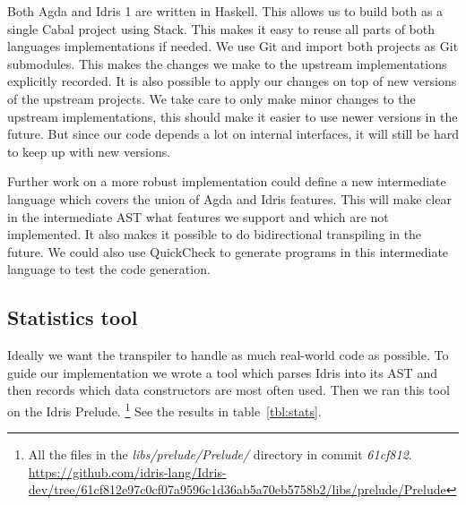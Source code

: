 Both Agda and Idris 1 are written in Haskell.  This allows us to build both as
a single Cabal project using Stack.  This makes it easy to reuse all parts of
both languages implementations if needed.  We use Git and import both projects
as Git submodules. This makes the changes we make to the upstream
implementations explicitly recorded. It is also possible to apply our changes
on top of new versions of the upstream projects.  We take care to only make
minor changes to the upstream implementations, this should make it easier to
use newer versions in the future.  But since our code depends a lot on internal
interfaces, it will still be hard to keep up with new versions.



Further work on a more robust implementation could define a new intermediate
language which covers the union of Agda and Idris features.
This will make clear in the intermediate AST what features we support and which
are not implemented.
It also makes it possible to do bidirectional transpiling in the future.
We could also use QuickCheck to generate programs in this intermediate language
to test the code generation.


\subsection{Statistics tool}\label{sec:meth-stats}
Ideally we want the transpiler to handle as much real-world code as possible.
To guide our implementation we wrote a tool which parses Idris into its AST and
then records which data constructors are most often used. Then we ran this tool
on the Idris Prelude.
\footnote{ All the files in the \textit{libs/prelude/Prelude/} directory in commit \textit{61cf812}.
\url{https://github.com/idris-lang/Idris-dev/tree/61cf812e97c0cf07a9596c1d36ab5a70eb5758b2/libs/prelude/Prelude}}
See the results in table~\ref{tbl:stats}.


